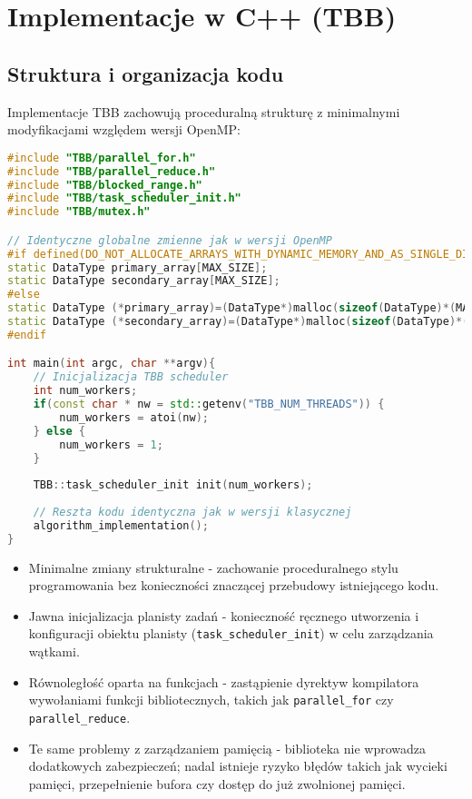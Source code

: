 \section{Implementacje w C++ (TBB)}
\subsection{Struktura i organizacja kodu}
Implementacje TBB zachowują proceduralną strukturę z minimalnymi modyfikacjami względem wersji OpenMP:
\begin{lstlisting}[language=C++, caption={Implementacja TBB - struktura kodu}, label={lst:TBB-structure}]
#include "TBB/parallel_for.h"
#include "TBB/parallel_reduce.h"
#include "TBB/blocked_range.h"
#include "TBB/task_scheduler_init.h"
#include "TBB/mutex.h"

// Identyczne globalne zmienne jak w wersji OpenMP
#if defined(DO_NOT_ALLOCATE_ARRAYS_WITH_DYNAMIC_MEMORY_AND_AS_SINGLE_DIMENSION)
static DataType primary_array[MAX_SIZE];
static DataType secondary_array[MAX_SIZE];
#else
static DataType (*primary_array)=(DataType*)malloc(sizeof(DataType)*(MAX_SIZE));
static DataType (*secondary_array)=(DataType*)malloc(sizeof(DataType)*(MAX_SIZE));
#endif

int main(int argc, char **argv){
    // Inicjalizacja TBB scheduler
    int num_workers;
    if(const char * nw = std::getenv("TBB_NUM_THREADS")) {
        num_workers = atoi(nw);
    } else {
        num_workers = 1;
    }
    
    TBB::task_scheduler_init init(num_workers);
    
    // Reszta kodu identyczna jak w wersji klasycznej
    algorithm_implementation();
}
\end{lstlisting}
\begin{itemize}
    \item Minimalne zmiany strukturalne - zachowanie proceduralnego stylu programowania bez konieczności znaczącej przebudowy istniejącego kodu.
    
    \item Jawna inicjalizacja planisty zadań - konieczność ręcznego utworzenia i konfiguracji obiektu planisty (\texttt{task\_scheduler\_init}) w celu zarządzania wątkami.
    
    \item Równoległość oparta na funkcjach - zastąpienie dyrektyw kompilatora wywołaniami funkcji bibliotecznych, takich jak \texttt{parallel\_for} czy \texttt{parallel\_reduce}.
    
    \item Te same problemy z zarządzaniem pamięcią - biblioteka nie wprowadza dodatkowych zabezpieczeń; nadal istnieje ryzyko błędów takich jak wycieki pamięci, przepełnienie bufora czy dostęp do już zwolnionej pamięci.
\end{itemize}
  
